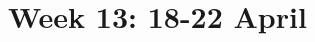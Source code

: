 \documentclass[cal1spr16Lectures.tex]{subfiles}
\begin{document}
\section[Week 13]{Week 13: 18-22 April}




\end{document}
